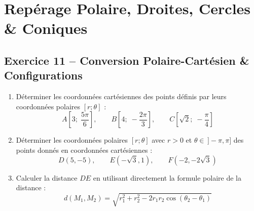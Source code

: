 \documentclass[11pt,a4paper]{article}
\begin{document}
\vspace{0.4cm}

\section{Repérage Polaire, Droites, Cercles \& Coniques}

\subsection*{Exercice 11 -- Conversion Polaire-Cartésien \& Configurations}

\begin{enumerate}[label=\arabic*.]
    \item Déterminer les coordonnées cartésiennes des points définis par leurs coordonnées polaires $[r; \theta]$ :
    \[
    A\left[3; \; \frac{5\pi}{6}\right], \qquad B\left[4; \; -\frac{2\pi}{3}\right], \qquad C\left[\sqrt{2}; \; -\frac{\pi}{4}\right]
    \]
    \item Déterminer les coordonnées polaires $[r; \theta]$ avec $r > 0$ et $\theta \in \,]-\pi, \pi]$ des points donnés en coordonnées cartésiennes :
    \[
    D(5, -5), \qquad E(-\sqrt{3}, 1), \qquad F(-2, -2\sqrt{3})
    \]
    \item Calculer la distance $DE$ en utilisant directement la formule polaire de la distance :
    \[
    d(M_1, M_2) = \sqrt{r_1^2 + r_2^2 - 2r_1 r_2 \cos(\theta_2 - \theta_1)}
    \]
\end{enumerate}
\end{document}
